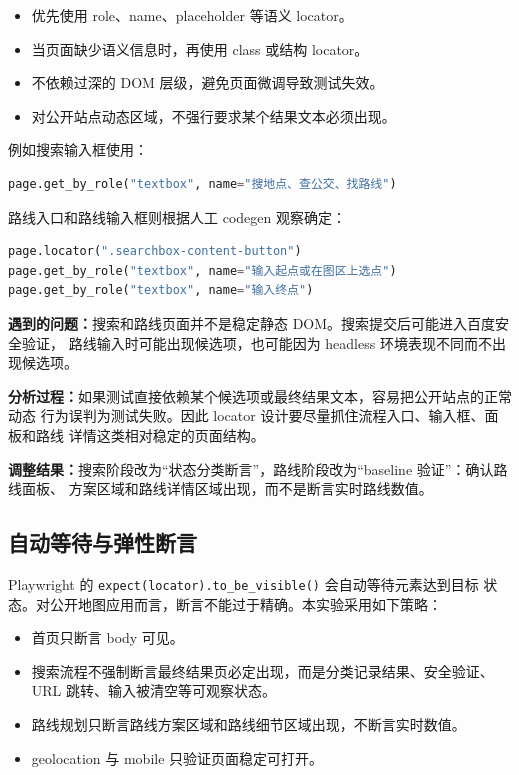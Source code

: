 \documentclass[UTF8,a4paper,12pt]{ctexart}
\newcommand{\problem}[1]{\par\noindent\textbf{遇到的问题：}#1\par}
\newcommand{\analysis}[1]{\par\noindent\textbf{分析过程：}#1\par}
\newcommand{\fix}[1]{\par\noindent\textbf{调整结果：}#1\par}
\begin{document}
\begin{itemize}
  \item 优先使用 role、name、placeholder 等语义 locator。
  \item 当页面缺少语义信息时，再使用 class 或结构 locator。
  \item 不依赖过深的 DOM 层级，避免页面微调导致测试失效。
  \item 对公开站点动态区域，不强行要求某个结果文本必须出现。
\end{itemize}

例如搜索输入框使用：

\begin{lstlisting}[language=Python]
page.get_by_role("textbox", name="搜地点、查公交、找路线")
\end{lstlisting}

路线入口和路线输入框则根据人工 codegen 观察确定：

\begin{lstlisting}[language=Python]
page.locator(".searchbox-content-button")
page.get_by_role("textbox", name="输入起点或在图区上选点")
page.get_by_role("textbox", name="输入终点")
\end{lstlisting}

\problem{搜索和路线页面并不是稳定静态 DOM。搜索提交后可能进入百度安全验证，
路线输入时可能出现候选项，也可能因为 headless 环境表现不同而不出现候选项。}

\analysis{如果测试直接依赖某个候选项或最终结果文本，容易把公开站点的正常动态
行为误判为测试失败。因此 locator 设计要尽量抓住流程入口、输入框、面板和路线
详情这类相对稳定的页面结构。}

\fix{搜索阶段改为“状态分类断言”，路线阶段改为“baseline 验证”：确认路线面板、
方案区域和路线详情区域出现，而不是断言实时路线数值。}

\subsection{自动等待与弹性断言}

Playwright 的 \texttt{expect(locator).to\_be\_visible()} 会自动等待元素达到目标
状态。对公开地图应用而言，断言不能过于精确。本实验采用如下策略：

\begin{itemize}
  \item 首页只断言 body 可见。
  \item 搜索流程不强制断言最终结果页必定出现，而是分类记录结果、安全验证、
  URL 跳转、输入被清空等可观察状态。
  \item 路线规划只断言路线方案区域和路线细节区域出现，不断言实时数值。
  \item geolocation 与 mobile 只验证页面稳定可打开。
\end{itemize}
\end{document}
